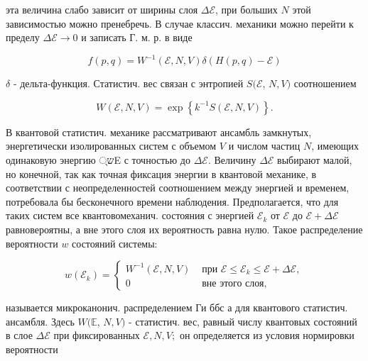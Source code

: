 \documentclass[10pt]{article}
\begin{document}
эта величина слабо зависит от ширины слоя $\Delta \mathscr{E}$, при больших $N$ этой зависимостью можно пренебречь. В случае классич. механики можно перейти к пределу $\Delta \mathscr{E} \rightarrow 0$ и записать Г. м. р. в виде



\[

f(p, q)=W^{-1}(\mathscr{E}, N, V) \delta(H(p, q)-\mathscr{E})

\]



$\delta$ - дельта-функция. Статистич. вес связан с энтропией $S(\mathscr{E}$, $N, V)$ соотношением



\[

W(\mathscr{E}, N, V)=\exp \left\{k^{-1} S(\mathscr{E}, N, V)\right\} .

\]



В квантовой статистич. механике рассматривают ансамбль замкнутых, энергетически изолированных систем с объемом $V$ и числом частиц $N$, имеющих одинаковую энергию ש्E с точностью до $\Delta \mathscr{E}$. Величину $\Delta \mathscr{E}$ выбирают малой, но конечной, так как точная фиксация энергии в квантовой механике, в соответствии с неопределенностей соотношением между энергией и временем, потребовала бы бесконечного времени наблюдения. Предполагается, что для таких систем все квантовомеханич. состояния с энергией $\mathscr{E}_{k}$ от $\mathscr{E}$ до $\mathscr{E}+\Delta \mathscr{E}$ равновероятны, а вне этого слоя их вероятность равна нулю. Такое распределение вероятности $w$ состояний системы:



\[

w\left(\mathscr{E}_{k}\right)= \begin{cases}W^{-1}(\mathscr{E}, N, V) & \text { при } \mathscr{E} \leqslant \mathscr{E}_{k} \leqslant \mathscr{E}+\Delta \mathscr{E}, \\ 0 & \text { вне этого слоя, }\end{cases}

\]



называется микроканонич. распределением Ги ббс а для квантового статистич. ансамбля. Здесь $W(\mathbb{E}$, $N, V)$ - статистич. вес, равный числу квантовых состояний в слое $\Delta \mathscr{E}$ при фиксированных $\mathscr{E}, N, V ;$ он определяется из условия нормировки вероятности
\end{document}
